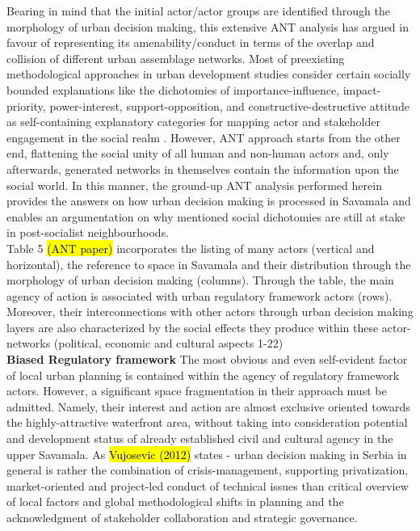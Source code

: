 \documentclass[11pt]{report}
\begin{document}
Bearing in mind that the initial actor/actor groups are identified through the morphology of urban decision making, this extensive ANT analysis has argued in favour of representing its amenability/conduct in terms of the overlap and collision of different urban assemblage networks.
Most of preexisting methodological approaches in urban development studies consider certain socially bounded explanations {like the dichotomies of importance-influence, impact-priority, power-interest, support-opposition, and constructive-destructive attitude} as self-containing explanatory categories for mapping actor and stakeholder engagement in the social realm \cite{Mathur}. However, ANT approach starts from the other end, flattening the social unity of all human and non-human actors and, only afterwards, generated networks in themselves contain the information upon the social world.
In this manner, the ground-up ANT analysis performed herein provides the answers on how urban decision making is processed in Savamala and enables an argumentation on why mentioned social dichotomies are still at stake in post-socialist neighbourhoods.
\\
Table 5 \hl{(ANT paper)} incorporates the listing of many actors (vertical and horizontal), the reference to space in Savamala and their distribution through the morphology of urban decision making (columns). Through the table, the main agency of action is associated with urban regulatory framework actors (rows). Moreover, their interconnections  with other actors through urban decision making layers are also characterized by the social effects they produce within these actor-networks (political, economic and cultural aspects 1-22)
\\
\textbf{Biased Regulatory framework}
The most obvious and even self-evident factor of local urban planning is contained within the agency of regulatory framework actors.
However, a significant space fragmentation in their approach must be admitted. Namely, their interest and action are almost exclusive oriented towards the highly-attractive waterfront area, without taking into consideration potential and development status of already established civil and cultural agency in the upper Savamala.
As \hl{Vujosevic (2012)} states - urban decision making in Serbia in general is rather the combination of crisis-management, supporting privatization, market-oriented and project-led conduct of technical issues than critical overview of local factors and global methodological shifts in planning and the acknowledgment of stakeholder collaboration and strategic governance.
\end{document}
